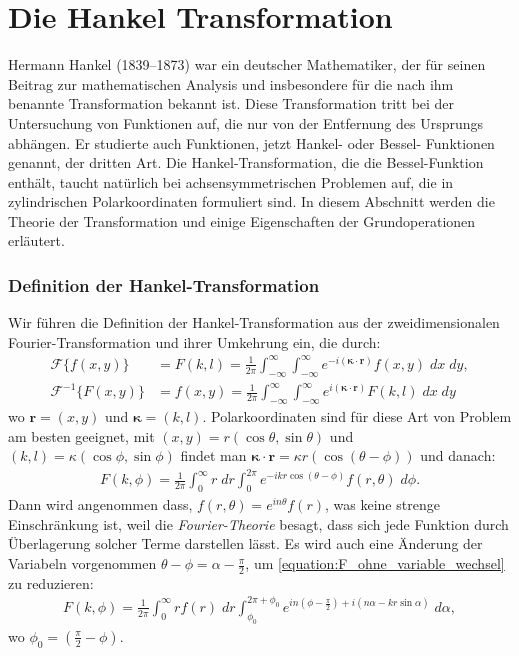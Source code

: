 %
%

\section{Die Hankel Transformation \label{kreismembran:section:teil2}}

Hermann Hankel (1839--1873) war ein deutscher Mathematiker, der für seinen Beitrag zur mathematischen Analysis und insbesondere für die nach ihm benannte Transformation bekannt ist.
Diese Transformation tritt bei der Untersuchung von Funktionen auf, die nur von der Entfernung des Ursprungs abhängen.
Er studierte auch Funktionen, jetzt Hankel- oder Bessel- Funktionen genannt, der dritten Art.
Die Hankel-Transformation, die die Bessel-Funktion enthält, taucht natürlich bei achsensymmetrischen Problemen auf, die in zylindrischen Polarkoordinaten formuliert sind.
In diesem Abschnitt werden die Theorie der Transformation und einige Eigenschaften der Grundoperationen erläutert.

\subsubsection{Definition der Hankel-Transformation \label{subsub:hankel_tansformation}}
Wir führen die Definition der Hankel-Transformation \cite{lokenath_debnath_integral_2015} aus der zweidimensionalen Fourier-Transformation und ihrer Umkehrung ein, die durch:
\begin{align}
	\mathscr{F}\{f(x,y)\} & = F(k,l)=\frac{1}{2\pi}\int_{-\infty}^{\infty}\int_{-\infty}^{\infty}e^{-i( \bm{\kappa}\cdot \mathbf{r})}f(x,y) \; dx \; dy,\label{equation:fourier_transform}\\
	\mathscr{F}^{-1}\{F(x,y)\} & = f(x,y)=\frac{1}{2\pi}\int_{-\infty}^{\infty}\int_{-\infty}^{\infty}e^{i(\bm{\kappa}\cdot \mathbf{r})}F(k,l) \; dx \; dy \label{equation:inv_fourier_transform}
\end{align}
wo $\mathbf{r}=(x,y)$ und $\bm{\kappa}=(k,l)$. Polarkoordinaten sind für diese Art von Problem am besten geeignet, mit $(x,y)=r(\cos\theta,\sin\theta)$ und $(k,l)=\kappa(\cos\phi,\sin\phi)$ findet man $\bm{\kappa}\cdot\mathbf{r}=\kappa r(\cos(\theta-\phi))$ und danach:
\begin{align}
	F(k,\phi)=\frac{1}{2\pi}\int_{0}^{\infty}r \; dr \int_{0}^{2\pi}e^{-ikr\cos(\theta-\phi)}f(r,\theta) \; d\phi.
	\label{equation:F_ohne_variable_wechsel}
\end{align}
Dann wird angenommen dass, $f(r,\theta)=e^{in\theta}f(r)$, was keine strenge Einschränkung ist, weil die \textit{Fourier-Theorie} besagt, dass sich jede Funktion durch Überlagerung solcher Terme darstellen lässt. Es wird auch eine Änderung der Variabeln vorgenommen $\theta-\phi=\alpha-\frac{\pi}{2}$, um \eqref{equation:F_ohne_variable_wechsel} zu reduzieren:
\begin{align}
	F(k,\phi)=\frac{1}{2\pi}\int_{0}^{\infty}rf(r) \; dr \int_{\phi_{0}}^{2\pi+\phi_{0}}e^{in(\phi-\frac{\pi}{2})+i(n\alpha-kr\sin\alpha)} \; d\alpha,
	\label{equation:F_ohne_bessel}
\end{align}
wo $\phi_{0}=(\frac{\pi}{2}-\phi)$.

